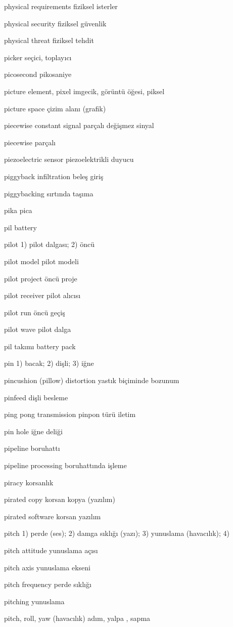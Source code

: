 \documentclass[12pt,fleqn]{article}\usepackage{../../common}
\begin{document}
physical requirements fiziksel isterler

physical security fiziksel güvenlik

physical threat fiziksel tehdit

picker seçici, toplayıcı

picosecond pikosaniye

picture element, pixel imgecik, görüntü öğesi, piksel

picture space çizim alanı (grafik)

piecewise constant signal parçalı değişmez sinyal

piecewise parçalı

piezoelectric sensor piezoelektrikli duyucu

piggyback infiltration beleş giriş

piggybacking sırtında taşıma

pika pica

pil battery

pilot 1) pilot dalgası; 2) öncü

pilot model pilot modeli

pilot project öncü proje

pilot receiver pilot alıcısı

pilot run öncü geçiş

pilot wave pilot dalga

pil takımı battery pack

pin 1) bacak; 2) dişli; 3) iğne

pincushion (pillow) distortion yastık biçiminde bozunum

pinfeed dişli besleme

ping pong transmission pinpon türü iletim

pin hole iğne deliği

pipeline boruhattı

pipeline processing boruhattında işleme

piracy korsanlık

pirated copy korsan kopya (yazılım)

pirated software korsan yazılım

pitch 1) perde (ses); 2) damga sıklığı (yazı); 3) yunuslama (havacılık); 4)

pitch attitude yunuslama açısı

pitch axis yunuslama ekseni

pitch frequency perde sıklığı

pitching yunuslama

pitch, roll, yaw (havacılık) adım, yalpa , sapma
\end{document}
